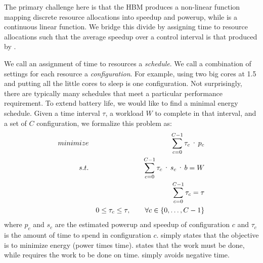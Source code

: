 The primary challenge here is that the HBM produces a non-linear
function mapping discrete resource allocations into speedup and
powerup, while  is a continuous linear
function.  We bridge this divide by assigning time to resource
allocations such that the average speedup over a control interval is
that produced by .

We call an assignment of time to resources a \emph{schedule}. We call
a combination of settings for each resource a \emph{configuration}.  For
example, using two big cores at 1.5 \GHz and putting all the little
cores to sleep is one configuration.  Not surprisingly, there are
typically many schedules that meet a particular performance
requirement.  To extend battery life, we would like to find a minimal
energy schedule. Given a time interval $\tau$, a workload $W$ to
complete in that interval, and a set of $C$ configuration, we
formalize this problem as:
\begin{eqnarray}
  \minimize && \sum_{c=0}^{C-1} \tau_c \cdot p_c \label{eqn:power} \\
  \st %
  && \sum_{c=0}^{C-1} \tau_c \cdot s_c \cdot b =  W \label{eqn:work} \\
  && \sum_{c=0}^{C-1} \tau_c =  \tau \label{eqn:deadline} \\
  && 0 \le \tau_c \le \tau, \qquad \forall c \in \{0,\ldots,C-1\} \label{eqn:time}
\end{eqnarray}
where $p_c$ and $s_c$ are the estimated powerup and speedup of
configuration $c$ and $\tau_c$ is the amount of time to spend in
configuration $c$.   simply states that the objective is
to minimize energy (power times time).   states that the
work must be done, while  requires the work to be
done on time.   simply avoids negative time.  


